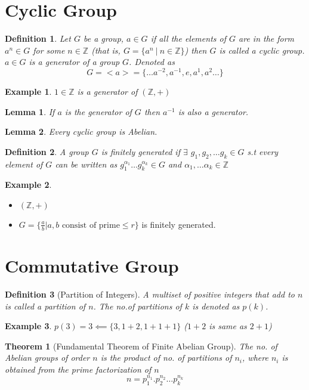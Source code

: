 \documentclass[12pt,a4paper]{article}
\newcommand{\Z}{\mathbb{Z}}
\newtheorem{thm}{Theorem}
\newtheorem*{defn}{Definition}
\newtheorem*{lem}{Lemma}
\newtheorem{ex}{Example}
\begin{document}
\section{Cyclic Group}

\begin{defn}\normalfont
	Let $G$ be a group, $a \in G$ if all the elements of $G$ are in the form $a^n \in G$ for some $n \in \Z$ (\textit{that is,} $G=\{a^n \: |\: n\in \Z\}$) then $G$ is called a \textit{cyclic group}. $a\in G$ is a generator of a group $G$. Denoted as 
	\[
		G = <a> = \{\dots a^{-2},a^{-1},e,a^{1},a^{2}\dots \}
	\]
\end{defn}

\begin{ex}
	$1 \in \Z$ is a generator of $(\Z, +)$
\end{ex}

\begin{lem}\normalfont
	If $a$ is the generator of $G$ then $a^{-1}$ is also a generator.
\end{lem}
\begin{lem}\normalfont
	Every cyclic group is Abelian.
\end{lem}
\begin{defn}\normalfont
	A group $G$ is finitely generated if $\exists$ $g_{1},g_{2},\dots g_{k}\in G$ s.t every element of $G$ can be written as $g_{1}^{{\alpha}_{1}} \dots g_{k}^{{\alpha}_{k}} \in G  $ and $\alpha_{1}, \dots \alpha_{k} \in \Z$
\end{defn}
\begin{ex}
\end{ex}	
\begin{itemize}
	\item $(\Z, +)$
	\item $G = \{\frac{a}{b} | a,b \text{ consist of prime} \le r\}$ is finitely generated.
\end{itemize}



\section{Commutative Group}
\begin{defn}[Partition of Integers]
	A multiset of positive integers that add to $n$ is called a partition of $n$. The no.of partitions of $k$ is denoted as $p(k)$.
\end{defn}
\begin{ex}
	$p(3) = 3 \impliedby \{3,1+2,1+1+1\}$ ($1+2$ is same as $2+1$)
\end{ex}
\begin{thm}[Fundamental Theorem of Finite Abelian Group]
	The no. of Abelian groups of order $n$ is the product of no. of partitions of $n_{i}$, where $n_{i}$ is obtained from the prime factorization of $n$ 
	$$
		n = p_{1}^{{n}_{1}}. p_{2}^{{n}_{2}}\dots p_{k}^{{n}_{k}}
	$$
\end{thm}
\end{document}
